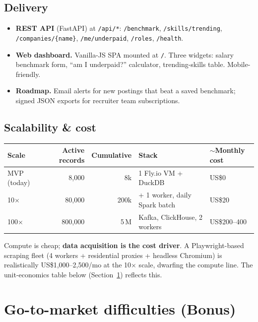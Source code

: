 \documentclass[11pt,a4paper]{article}
\begin{document}
\subsection{Delivery}
\begin{itemize}[leftmargin=*,itemsep=0.1em,topsep=0.2em]
  \item \textbf{REST API} (FastAPI) at \texttt{/api/*}:
    \texttt{/benchmark}, \texttt{/skills/trending},
    \texttt{/companies/\{name\}}, \texttt{/me/underpaid},
    \texttt{/roles}, \texttt{/health}.
  \item \textbf{Web dashboard.} Vanilla-JS SPA mounted at \texttt{/}.
    Three widgets: salary benchmark form, ``am I underpaid?'' calculator,
    trending-skills table. Mobile-friendly.
  \item \textbf{Roadmap.} Email alerts for new postings that beat a saved
    benchmark; signed JSON exports for recruiter team subscriptions.
\end{itemize}

\subsection{Scalability \& cost}
\label{sec:scalability}

\begin{center}\small
\begin{tabular}{lrrll}
\toprule
\textbf{Scale} & \textbf{Active records} & \textbf{Cumulative} & \textbf{Stack} & \textbf{$\sim$Monthly cost} \\
\midrule
MVP (today)  &      8{,}000 & 8k     & 1 Fly.io VM + DuckDB           & US\$0   \\
10$\times$   &     80{,}000 & 200k   & + 1 worker, daily Spark batch  & US\$20  \\
100$\times$  &    800{,}000 & 5\,M   & Kafka, ClickHouse, 2 workers   & US\$200--400 \\
\bottomrule
\end{tabular}
\end{center}

Compute is cheap; \textbf{data acquisition is the cost driver}. A
Playwright-based scraping fleet (4 workers + residential proxies + headless
Chromium) is realistically US\$1{,}000--2{,}500/mo at the 10$\times$
scale, dwarfing the compute line. The unit-economics table below
(Section~\ref{sec:gtm}) reflects this.

\section{Go-to-market difficulties (Bonus)}
\label{sec:gtm}
\end{document}

